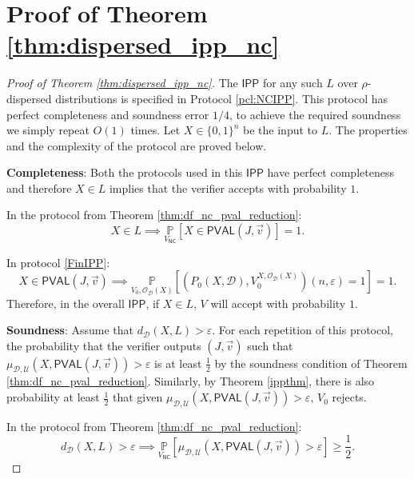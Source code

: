 \documentclass[11pt]{article}
\newcommand{\NC}{\mathsf{NC}}
\newcommand{\PVAL}{\mathsf{PVAL}}
\newcommand{\IPP}{\mathsf{IPP}}
\newcommand{\sD}{\mathcal{D}}
\begin{document}
\section{Proof of Theorem \ref{thm:dispersed_ipp_nc}}
\label{sec:dispersed_ipp_nc}
\begin{proof}[Proof of Theorem \ref{thm:dispersed_ipp_nc}]
The $\IPP$ for any such $L$ over $\rho$-dispersed distributions is specified in Protocol \ref{pcl:NCIPP}. This protocol has perfect completeness and soundness error $1/4$, to achieve the required soundness we simply repeat $O(1)$ times. Let $X \in \{0,1\}^n$ be the input to $L$. The properties and the complexity of the protocol are proved below.

\vspace{0.1in}
\textbf{Completeness}: Both the protocols used in this $\IPP$ have perfect completeness and therefore $X\in L$ implies that the verifier accepts with probability $1$.

In the protocol from Theorem \ref{thm:df_nc_pval_reduction}:
\begin{equation*}
    X\in L\implies \underset{V_{\NC}}{\mathbb{P}}[X\in \PVAL(J,\Vec{v})]=1.
\end{equation*}

In protocol \ref{FinIPP}:
\begin{equation*}
    X\in \PVAL(J,\Vec{v})\implies \underset{V_{0},\mathcal{O}_{\mathcal{D}}(X)}{\mathbb{P}}\left[(P_{0}(X,\sD),V_{0}^{X,\mathcal{O}_{\sD}(X)})(n,\varepsilon)=1\right]=1.
\end{equation*}
Therefore, in the overall $\IPP$, if $X\in L$, $V$ will accept with probability $1$.

\textbf{Soundness}: Assume that $d_{\mathcal{D}}(X,L)>\varepsilon$. For each repetition of this protocol, the probability that the verifier outputs $(J,\Vec{v})$ such that $\mu_{\mathcal{D},\mathcal{U}}(X,\PVAL(J,\Vec{v}))>\varepsilon$ is at least $\frac{1}{2}$ by the soundness condition of Theorem \ref{thm:df_nc_pval_reduction}. Similarly, by Theorem \ref{ippthm}, there is also probability at least $\frac{1}{2}$ that given $\mu_{\mathcal{D},\mathcal{U}}(X,\PVAL(J,\Vec{v}))>\varepsilon$, $V_{0}$ rejects. 

In the protocol from Theorem \ref{thm:df_nc_pval_reduction}:
\begin{equation*}
    d_{\sD}(X,L)>\varepsilon \implies \underset{{V_{\NC}}}{\mathbb{P}}[\mu_{\sD,\mathcal{U}}(X, \PVAL(J,\Vec{v}))>\varepsilon]\geq \frac{1}{2}.
\end{equation*}


\end{proof}
\end{document}
